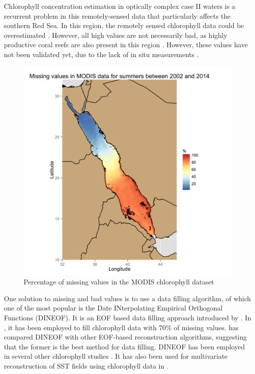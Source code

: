 Chlorophyll concentration estimation in optically complex case II waters is a
recurrent problem in this remotely-sensed data that particularly affects the
southern Red Sea.  In this region, the remotely sensed chlorophyll data could
be overestimated \citep{Raitsos2013}. However, all high values are not
necessarily bad, as highly productive coral reefs are also present in this
region \citep{Raitsos2013}.  However, these values have not been validated yet,
due to the lack of in situ measurements \citep{Raitsos2013}.

\begin{figure}[h]
    \centering
    \includegraphics[scale=.15]{figures/modis_missing_values_summer.png}
    \caption{Percentage of missing values in the MODIS chlorophyll dataset}
    \label{misval_modis}
\end{figure}

One solution to missing and bad values is to use a data filling algorithm, of
which one of the most popular is the Date INterpolating Empirical Orthogonal
Functions (DINEOF). It is an EOF based data filling approach introduced by
\citet{Beckers2003}. In \citet{Sicarjobs2011}, it has been employed to fill
chlorophyll data with 70\% of missing values.  \citet{Taylor2013} has compared
DINEOF with other EOF-based reconstruction algorithms, suggesting that the
former is the best method for data filling.  DINEOF has been employed in
several other chlorophyll studies \citep{Miles2010, Waite2013}. It has also
been used for multivariate reconstruction of SST fields using chlorophyll data
in \citet{Alvera2007}. 

